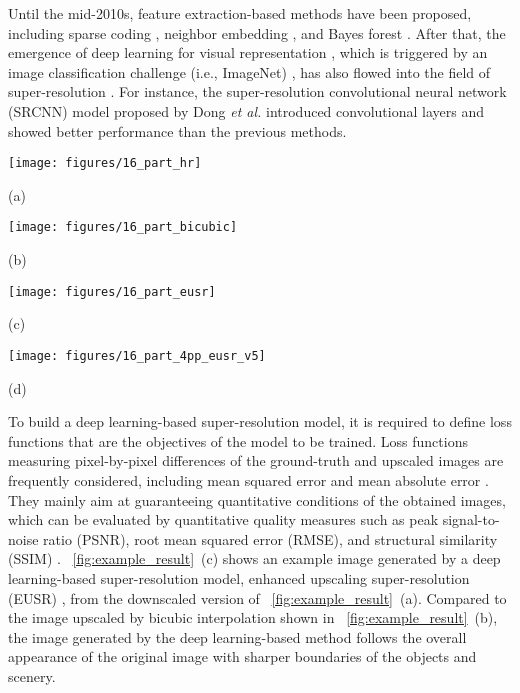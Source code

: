 \documentclass[runningheads]{llncs}
\begin{document}
Until the mid-2010s, feature extraction-based methods have been proposed, including sparse coding \cite{yang2011multitask}, neighbor embedding \cite{li2014single}, and Bayes forest \cite{salvador2015naive}.
After that, the emergence of deep learning for visual representation \cite{guo2016deep}, which is triggered by an image classification challenge (i.e., ImageNet) \cite{krizhevsky2012imagenet}, has also flowed into the field of super-resolution \cite{yang2018deep}.
For instance, the super-resolution convolutional neural network (SRCNN) model proposed by Dong \textit{et al.} \cite{dong2014learning} introduced convolutional layers and showed better performance than the previous methods.

\begin{figure*}[t]
	\centering
	\begin{minipage}[b]{0.24\linewidth}
		\centering
		\centerline{\texttt{[image: figures/16\_part\_hr]}}
		\centerline{(a)}
	\end{minipage}
	\begin{minipage}[b]{0.24\linewidth}
		\centering
		\centerline{\texttt{[image: figures/16\_part\_bicubic]}}
		\centerline{(b)}
	\end{minipage}
	\begin{minipage}[b]{0.24\linewidth}
		\centering
		\centerline{\texttt{[image: figures/16\_part\_eusr]}}
		\centerline{(c)}
	\end{minipage}
	\begin{minipage}[b]{0.24\linewidth}
		\centering
		\centerline{\texttt{[image: figures/16\_part\_4pp\_eusr\_v5]}}
		\centerline{(d)}
	\end{minipage}
	\caption{Example results obtained for an image of the PIRM dataset \cite{pirm2018sr}. (a) Ground-truth (b) Upscaled by bicubic interpolation (c) Upscaled without perceptual consideration (d) Upscaled with perceptual consideration}
	\label{fig:example_result}
\end{figure*}

To build a deep learning-based super-resolution model, it is required to define loss functions that are the objectives of the model to be trained.
Loss functions measuring pixel-by-pixel differences of the ground-truth and upscaled images are frequently considered, including mean squared error and mean absolute error \cite{yang2018deep}.
They mainly aim at guaranteeing quantitative conditions of the obtained images, which can be evaluated by quantitative quality measures such as peak signal-to-noise ratio (PSNR), root mean squared error (RMSE), and structural similarity (SSIM) \cite{wang2004image}.
\figurename~\ref{fig:example_result}~(c) shows an example image generated by a deep learning-based super-resolution model, enhanced upscaling super-resolution (EUSR) \cite{kim2018deep}, from the downscaled version of \figurename~\ref{fig:example_result}~(a).
Compared to the image upscaled by bicubic interpolation shown in \figurename~\ref{fig:example_result}~(b), the image generated by the deep learning-based method follows the overall appearance of the original image with sharper boundaries of the objects and scenery.
\end{document}
